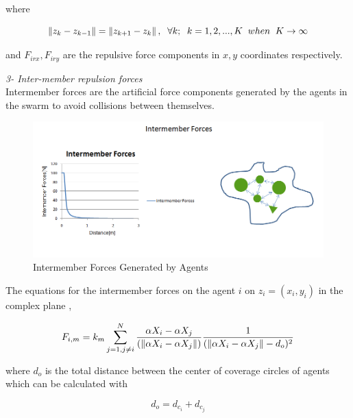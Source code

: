 where

\begin{equation}
\left\lVert z_k - z_{k-1}\right\rVert = \left\lVert z_{k+1} - z_k\right\rVert, \hspace{0.2cm}  \forall k ;  \hspace{0.2cm} k=1,2,...,K \hspace{0.2cm} when  \hspace{0.2cm} K \to\infty
\end{equation}
						
and $F_{irx} , F_{iry} $ are the repulsive force components in $x,y$ coordinates respectively. \newline
						
\textit{		3- Inter-member repulsion forces} \\ 
Intermember forces are the artificial force components generated by the agents in the swarm to avoid collisions between themselves. 
			
\begin{figure}[H]
\caption{Intermember Forces Generated by Agents}
\centering
\includegraphics[scale = 0.60]{intermember_forces}
\end{figure}
			
The equations for the intermember forces on the agent $i$ on $z_i = (x_i, y_i)$  in the complex plane \cite{17},
			
\begin{equation}
F_{i,m} = k_m \sum_{j=1, j\neq i}^{N}\frac{\alpha X_i - \alpha X_j}{(\left\lVert\alpha X_i - \alpha X_j\right\rVert)} \frac{1}{(\left\lVert\alpha X_i - \alpha X_j\right\rVert - d_o)^2}
\end{equation}
			
where $d_o$ is the total distance between the center of coverage circles of agents which can be calculated with

\begin{equation}
 d_o = d_{c_i} + d_{c_j}
\end{equation}			

